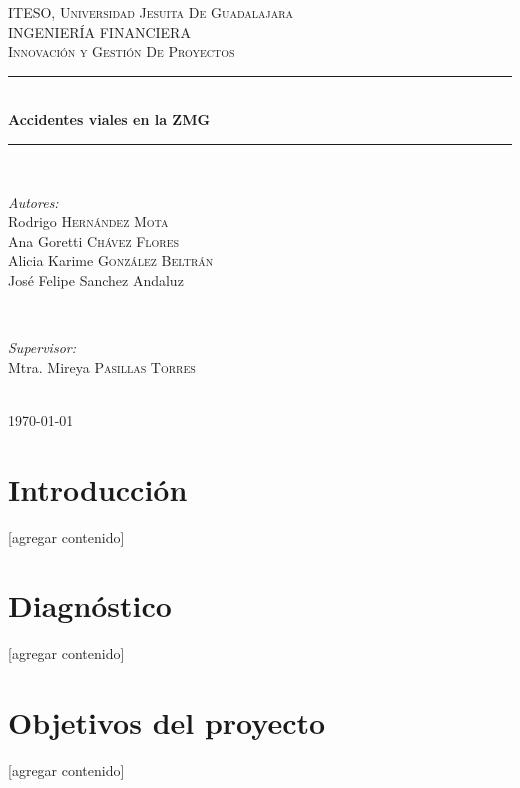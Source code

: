 \documentclass{article}
\begin{document}
\begin{titlepage}
\newcommand{\HRule}{\rule{\linewidth}{0.5mm}}

\center
\textsc{\LARGE ITESO, Universidad Jesuita De Guadalajara}\\[2cm]
\textsc{\Large INGENIERÍA FINANCIERA}\\[1cm]
\textsc{\large Innovación y Gestión De Proyectos}\\[1cm]
\HRule \\[2cm]
{ \huge \bfseries Accidentes viales en la ZMG}\\[2cm] 
\HRule \\[2cm]
\begin{minipage}{0.4\textwidth}
\begin{flushleft} \large


\emph{Autores:}\\
Rodrigo \textsc{Hernández Mota}\\
Ana Goretti \textsc{Chávez Flores}\\
Alicia Karime \textsc{González Beltrán}\\
José Felipe \textsc{}{Sanchez Andaluz}
\end{flushleft}
\end{minipage}
~
\begin{minipage}{0.4\textwidth}
\begin{flushright} \large
\emph{Supervisor:} \\
Mtra. Mireya \textsc{Pasillas Torres}
\end{flushright}
\end{minipage}\\[2cm]

{\large \today}\\[1cm]

\vfill
 
\end{titlepage}
\tableofcontents
\newpage

\section{Introducción}\label{sec:into}
[agregar contenido]

\section{Diagnóstico}\label{sec:diagnostic}
[agregar contenido]

\section{Objetivos del proyecto}\label{sec:objs}
[agregar contenido]
\end{document}
